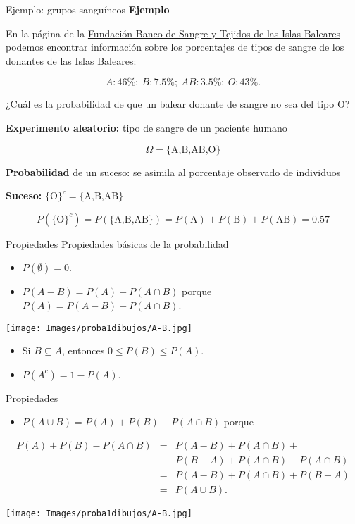 \documentclass[
  ignorenonframetext,
]{beamer}
\providecommand{\tightlist}{%
  \setlength{\itemsep}{0pt}\setlength{\parskip}{0pt}}
\begin{document}
\begin{frame}{Ejemplo: grupos sanguíneos}
\protect\hypertarget{ejemplo-grupos-sanguuxedneos}{}
\textbf{Ejemplo}

En la página de la
\href{http://www.donasang.org/que-es-la-sang/es_frequencies-dels-diferents-grups.html}{Fundación
Banco de Sangre y Tejidos de las Islas Baleares} podemos encontrar
información sobre los porcentajes de tipos de sangre de los donantes de
las Islas Baleares:

\[A: 46\%;\  B: 7.5\%;\  AB: 3.5\%;\  O: 43\%.\]

¿Cuál es la probabilidad de que un balear donante de sangre no sea del
tipo O?

\textbf{Experimento aleatorio:} tipo de sangre de un paciente humano

\[\Omega=\{\mbox{A,B,AB,O}\}\]

\textbf{Probabilidad} de un suceso: se asimila al porcentaje observado
de individuos

\textbf{Suceso:} \(\{\mbox{O}\}^c=\{\mbox{A,B,AB}\}\)

\[P(\{\mbox{O}\}^c)\!=\!P(\{\mbox{A,B,AB}\})\!=\!
P(\mbox{A})+P (\mbox{B})+P(\mbox{AB})\!=\!0.57\]
\end{frame}

\begin{frame}{Propiedades}
\protect\hypertarget{propiedades-8}{}
Propiedades básicas de la probabilidad

\begin{itemize}
\item
  \(P(\emptyset)=0\).
\item
  \(P(A-B)=P(A)-P(A\cap B)\) porque \(P(A)=P(A-B)+P(A\cap B)\).
\end{itemize}

\texttt{[image: Images/proba1dibujos/A-B.jpg]}

\begin{itemize}
\item
  Si \(B\subseteq A\), entonces \(0\leq P(B)\leq P(A)\).
\item
  \(P(A^c)=1-P(A)\).
\end{itemize}
\end{frame}

\begin{frame}{Propiedades}
\protect\hypertarget{propiedades-9}{}
\begin{itemize}
\tightlist
\item
  \(P(A\cup B)=P(A)+P(B)-P(A\cap B)\) porque
\end{itemize}

\[\begin{eqnarray*}
P(A)+P(B)-P(A\cap B) &=& P(A-B)+P(A\cap B)+\\
 & & P(B-A)+ P(A\cap  B)-P(A\cap  B)\\
&=& P(A-B)+P(A\cap B)+ P(B-A) \\
&=& P(A\cup B).
\end{eqnarray*}\]

\texttt{[image: Images/proba1dibujos/A-B.jpg]}
\end{frame}
\end{document}
